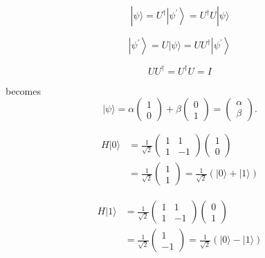 \begin{equation}
|\psi\rangle=U^{\dagger}\left|\psi^{\prime}\right\rangle=U^{\dagger} U|\psi\rangle
\end{equation} 

\begin{equation}
\left|\psi^{\prime}\right\rangle=U|\psi\rangle=U U^{\dagger}\left|\psi^{\prime}\right\rangle
\end{equation}

\begin{equation}
U U^{\dagger}=U^{\dagger} U=I
\end{equation}

becomes
\begin{equation}
|\psi\rangle=\alpha\left(\begin{array}{l}
1 \\
0
\end{array}\right)+\beta\left(\begin{array}{l}
0 \\
1
\end{array}\right)=\left(\begin{array}{l}
\alpha \\
\beta
\end{array}\right).
\end{equation}

\begin{equation}
\begin{aligned}
H|0\rangle &=\frac{1}{\sqrt{2}}\left(\begin{array}{cc}
1 & 1 \\
1 & -1
\end{array}\right)\left(\begin{array}{l}
1 \\
0
\end{array}\right) \\
&=\frac{1}{\sqrt{2}}\left(\begin{array}{l}
1 \\
1
\end{array}\right)=\frac{1}{\sqrt{2}}(|0\rangle+|1\rangle)
\end{aligned}
\end{equation}

\begin{equation}
\begin{aligned}
H|1\rangle &=\frac{1}{\sqrt{2}}\left(\begin{array}{cc}
1 & 1 \\
1 & -1
\end{array}\right)\left(\begin{array}{l}
0 \\
1
\end{array}\right) \\
&=\frac{1}{\sqrt{2}}\left(\begin{array}{c}
1 \\
-1
\end{array}\right)=\frac{1}{\sqrt{2}}(|0\rangle-|1\rangle)
\end{aligned}
\end{equation}


